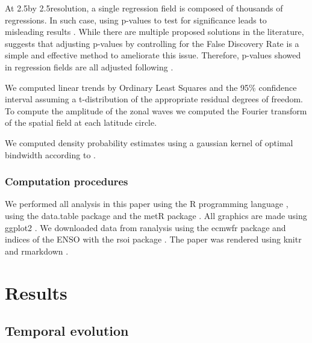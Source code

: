 \documentclass[smallextended]{svjour3}       %
\begin{document}
At 2.5\degree by 2.5\degree resolution, a single regression field is composed of thousands of regressions. In such case, using p-values to test for significance leads to misleading results \citep{walker1914, katz1991}. While there are multiple proposed solutions in the literature, \citet{wilks2016} suggests that adjusting p-values by controlling for the False Discovery Rate \citep{benjamini1995} is a simple and effective method to ameliorate this issue. Therefore, p-values showed in regression fields are all adjusted following \citet{benjamini1995}.

We computed linear trends by Ordinary Least Squares and the 95\% confidence interval assuming a t-distribution of the appropriate residual degrees of freedom. To compute the amplitude of the zonal waves we computed the Fourier transform of the spatial field at each latitude circle.

We computed density probability estimates using a gaussian kernel of optimal bindwidth according to \citet{sheather1991}.

\hypertarget{computation-procedures}{%
\subsubsection{Computation procedures}\label{computation-procedures}}

We performed all analysis in this paper using the R programming language \citep{rcoreteam2020}, using the data.table package \citep{dowle2020} and the metR package \citep{campitelli2020}. All graphics are made using ggplot2 \citep{wickham2009}. We downloaded data from ranalysis using the ecmwfr package \citep{hufkens2020} and indices of the ENSO with the rsoi package \citep{albers2020}. The paper was rendered using knitr and rmarkdown \citep{xie2015, allaire2019}.

\hypertarget{results}{%
\section{Results}\label{results}}

\hypertarget{temporal}{%
\subsection{Temporal evolution}\label{temporal}}
\end{document}
